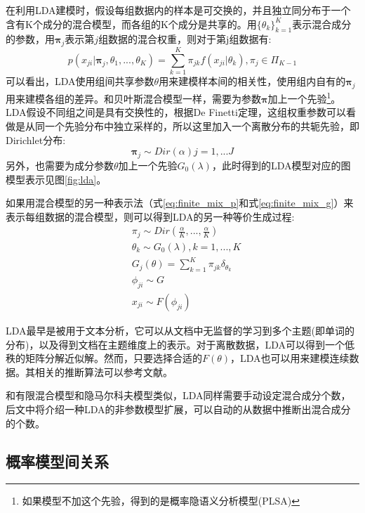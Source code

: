 在利用LDA建模时，假设每组数据内的样本是可交换的，并且独立同分布于一个含有K个成分的混合模型，而各组的K个成分是共享的。用${\{\theta_k\}}_{k=1}^K$表示混合成分的参数，用${\bm \pi}_j$表示第$j$组数据的混合权重，则对于第j组数据有:
\begin{equation}
p(x_{ji}|{\bm \pi}_j,\theta_1,...,\theta_K) = \sum_{k=1}^K\pi_{jk}f(x_{ji}|\theta_k),\pi_j \in \Pi_{K-1}
\end{equation}
可以看出，LDA使用组间共享参数$\theta$用来建模样本间的相关性，使用组内自有的${\bm \pi}_j$用来建模各组的差异。和贝叶斯混合模型一样，需要为参数${\bm \pi}$加上一个先验\footnote{如果模型不加这个先验，得到的是概率隐语义分析模型(PLSA)}。LDA假设不同组之间是具有交换性的，根据De Finetti定理\cite{de1931funzione}，这组权重参数可以看做是从同一个先验分布中独立采样的，所以这里加入一个离散分布的共轭先验，即Dirichlet分布:
\begin{equation}
{\bm \pi}_j \sim Dir(\alpha) j = 1,...J
\end{equation}
另外，也需要为成分参数$\theta$加上一个先验$G_0(\lambda)$，此时得到的LDA模型对应的图模型表示见图\ref{fig:lda}。

如果用混合模型的另一种表示法（式\eqref{eq:finite_mix_p}和式\eqref{eq:finite_mix_g}）来表示每组数据的混合模型，则可以得到LDA的另一种等价生成过程:
\begin{equation}
\begin{split}
& \pi_j \sim Dir(\frac{\alpha}{K},...,\frac{\alpha}{K})\\
& \theta_k \sim G_0(\lambda), k = 1,...,K\\
& G_j(\theta) = \sum_{k=1}^K\pi_{jk}\delta_{\theta_k}\\
& \phi_{ji} \sim G\\
& x_{ji} \sim F(\phi_{ji}) 
\end{split} \label{eq:LDA_alt}
\end{equation}

LDA最早是被用于文本分析，它可以从文档中无监督的学习到多个主题(即单词的分布)，以及得到文档在主题维度上的表示。对于离散数据，LDA可以得到一个低秩的矩阵分解近似解。然而，只要选择合适的$F(\theta)$，LDA也可以用来建模连续数据。其相关的推断算法可以参考文献\cite{blei2003latent,heinrich2005parameter}。

和有限混合模型和隐马尔科夫模型类似，LDA同样需要手动设定混合成分个数，后文中将介绍一种LDA的非参数模型扩展，可以自动的从数据中推断出混合成分的个数。


\subsection{概率模型间关系}

